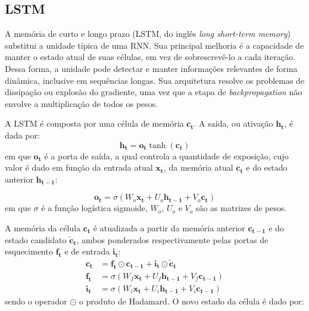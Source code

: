 \subsection{LSTM}
A memória de curto e longo prazo (LSTM, do inglês \textit{long short-term
memory}) \cite{chung2014empirical} substitui a unidade típica de uma RNN. Sua
principal melhoria é a capacidade de manter o estado atual
de suas células, em vez de sobrescrevê-lo a cada iteração. Dessa forma, a
unidade pode detectar e manter informações relevantes de forma dinâmica,
inclusive em sequências longas. Sua arquitetura resolve os problemas de dissipação ou explosão do
gradiente, uma vez que a etapa de \textit{backpropagation} não envolve a
multiplicação de todos os pesos.

A LSTM é composta por uma célula de memória $\mathbf{c_t}$. A saída, ou ativação
$\mathbf{h_t}$, é dada por:
\begin{equation}
    \mathbf{h_t} = \mathbf{o_t}\tanh(\mathbf{c_t})
\end{equation}
em que $\mathbf{o_t}$ é a porta de saída, a qual controla a quantidade de
exposição, cujo valor é dado em função da entrada atual $\mathbf{x_t}$, da memória atual $\mathbf{c_t}$ e do
estado anterior $\mathbf{h_{t-1}}$:

\begin{equation}
    \mathbf{o_t} = \sigma(W_o\mathbf{x_t} + U_o\mathbf{h_{t-1}} + V_o\mathbf{c_t})
\end{equation}
em que $\sigma$ é a função logística sigmoide, $W_o$, $U_o$ e $V_o$ são as
matrizes de pesos.

A memória da célula $\mathbf{c_t}$ é atualizada a partir da memória anterior
$\mathbf{c_{t-1}}$ e do estado candidato $\mathbf{\tilde{c}_t}$, ambos ponderados
respectivamente pelas portas de esquecimento $\mathbf{f_t}$ e de entrada $\mathbf{i_t}$:
\begin{align}
    \mathbf{c_t} &= \mathbf{f_t} \odot \mathbf{c_{t-1}} + \mathbf{i_t} \odot \mathbf{\tilde{c}_t} \\
    \mathbf{f_t} &= \sigma(W_f\mathbf{x_t} + U_f\mathbf{h_{t-1}} + V_f\mathbf{c_{t-1}}) \\
    \mathbf{i_t} &= \sigma(W_i\mathbf{x_t} + U_i\mathbf{h_{t-1}} + V_i\mathbf{c_{t-1}})
\end{align}
sendo o operador $\odot$ o produto
de Hadamard. O novo estado da célula é dado por:

